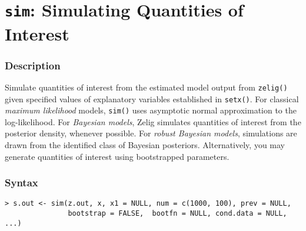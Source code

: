 \section{{\tt sim}: Simulating Quantities of Interest}\label{ss:sim}

\subsubsection{Description}
Simulate quantities of interest from the estimated model output from
\texttt{zelig()} given specified values of explanatory variables
established in \texttt{setx()}.  For classical \emph{maximum
  likelihood} models, {\tt sim()} uses asymptotic normal approximation
to the log-likelihood.  For \emph{Bayesian models}, Zelig simulates
quantities of interest from the posterior density, whenever possible.
For \emph{robust Bayesian models}, simulations are drawn from the
identified class of Bayesian posteriors.  Alternatively, you may
generate quantities of interest using bootstrapped parameters.  

\subsubsection{Syntax}
\begin{verbatim}
> s.out <- sim(z.out, x, x1 = NULL, num = c(1000, 100), prev = NULL,
               bootstrap = FALSE,  bootfn = NULL, cond.data = NULL, ...)
\end{verbatim}

